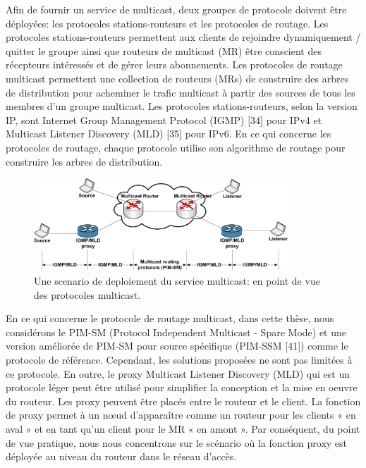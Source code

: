 Afin de fournir un service de multicast, deux groupes de protocole doivent être déployées: les protocoles stations-routeurs et les protocoles de routage. Les protocoles stations-routeurs permettent aux clients de rejoindre dynamiquement / quitter le groupe ainsi que routeurs de multicast (MR) être conscient des récepteurs intéressés et de gérer leurs abonnements. Les protocoles de routage multicast permettent une collection de routeurs  (MRs) de construire des arbres de distribution pour acheminer le trafic multicast à partir des sources de tous les membres d'un groupe multicast. Les protocoles stations-routeurs, selon la version IP, sont Internet Group Management Protocol (IGMP) [34] pour IPv4 et Multicast Listener Discovery (MLD) [35] pour IPv6. En ce qui concerne les protocoles de routage, chaque protocole utilise son algorithme de routage pour construire les arbres de distribution.

\begin{figure}[h!] 
 \begin{center} 
 \includegraphics[width=0.85\textwidth]{./Part1/Chapter2/figures/c2_multicast_deployment.eps} 
    \caption[Une scenario de deploiement du service multicast: en point de vue des protocoles multicast]{Une scenario de deploiement du service multicast: en point de vue des protocoles multicast.}
     \label{fig:c2_multicast_deployment}
  \end{center} 
\end{figure}

En ce qui concerne le protocole de routage multicast, dans cette thèse, nous considérons le PIM-SM (Protocol Independent Multicast - Spare Mode) et une version améliorée de PIM-SM pour source spécifique (PIM-SSM [41]) comme le protocole de référence. Cependant, les solutions proposées ne sont pas limitées à ce protocole. En outre, le proxy Multicast Listener Discovery (MLD) qui est un protocole léger peut être utilisé pour simplifier la conception et la mise en oeuvre du routeur. Les proxy peuvent être placés entre le routeur et le client. La fonction de proxy permet à un nœud d'apparaître comme un routeur pour les clients « en aval » et en tant qu'un client pour le MR « en amont ». Par conséquent, du point de vue pratique, nous nous concentrons sur le scénario où la fonction proxy est déployée au niveau du routeur dans le réseau d'accès.

